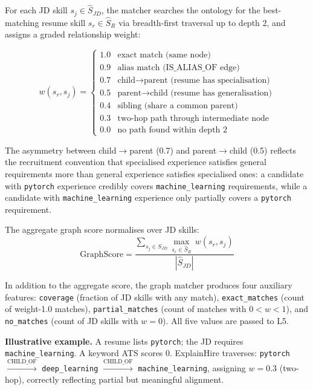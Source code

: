 \documentclass[conference]{IEEEtran}
\begin{document}
For each JD skill $s_j \in \hat{S}_{JD}$, the matcher searches the ontology
for the best-matching resume skill $s_r \in \hat{S}_R$ via breadth-first
traversal up to depth 2, and assigns a graded relationship weight:

\begin{equation}
  w(s_r, s_j) =
  \begin{cases}
    1.0 & \text{exact match (same node)} \\
    0.9 & \text{alias match (IS\_ALIAS\_OF edge)} \\
    0.7 & \text{child} \to \text{parent (resume has specialisation)} \\
    0.5 & \text{parent} \to \text{child (resume has generalisation)} \\
    0.4 & \text{sibling (share a common parent)} \\
    0.3 & \text{two-hop path through intermediate node} \\
    0.0 & \text{no path found within depth 2}
  \end{cases}
  \label{eq:weights}
\end{equation}

The asymmetry between child$\to$parent (0.7) and parent$\to$child (0.5)
reflects the recruitment convention that specialised experience satisfies
general requirements more than general experience satisfies specialised ones:
a candidate with \texttt{pytorch} experience credibly covers
\texttt{machine\_learning} requirements, while a candidate with
\texttt{machine\_learning} experience only partially covers a
\texttt{pytorch} requirement.

The aggregate graph score normalises over JD skills:
\begin{equation}
  \text{GraphScore} = \frac{\displaystyle\sum_{s_j \in \hat{S}_{JD}}
    \max_{s_r \in \hat{S}_R}\, w(s_r, s_j)}{|\hat{S}_{JD}|}
  \label{eq:graphscore}
\end{equation}

In addition to the aggregate score, the graph matcher produces four auxiliary
features: \texttt{coverage} (fraction of JD skills with any match),
\texttt{exact\_matches} (count of weight-1.0 matches),
\texttt{partial\_matches} (count of matches with $0 < w < 1$), and
\texttt{no\_matches} (count of JD skills with $w = 0$). All five values
are passed to L5.

\noindent\textbf{Illustrative example.} A resume lists \texttt{pytorch};
the JD requires \texttt{machine\_learning}. A keyword ATS scores 0.
ExplainHire traverses: \texttt{pytorch} $\xrightarrow{\text{CHILD\_OF}}$
\texttt{deep\_learning} $\xrightarrow{\text{CHILD\_OF}}$
\texttt{machine\_learning}, assigning $w = 0.3$ (two-hop), correctly
reflecting partial but meaningful alignment.
\end{document}
